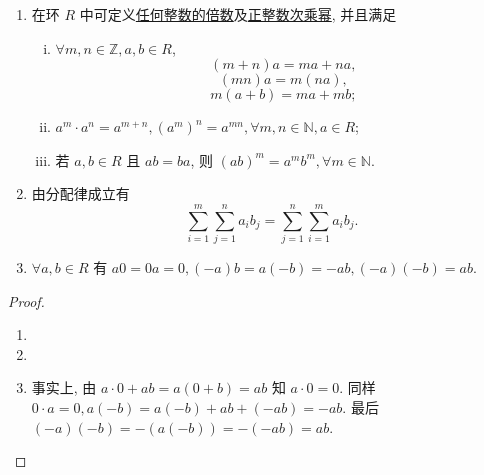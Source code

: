 \documentclass[../../main.tex]{subfiles}%
\begin{document}
\begin{theorem}[环的基本性质]\label{theorem:环的基本性质}
\begin{enumerate}[(1)]
\item 在环 \( R \) 中可定义\hyperref[definition:倍数的定义]{任何整数的倍数}及\hyperref[definition:n次乘幂]{正整数次乘幂}, 并且满足
\begin{enumerate}[(i)]
\item \( \forall m,n \in \mathbb{Z}, a,b \in R \),
\[
(m + n)a = ma + na,
\]
\[
(mn)a = m(na),
\]
\[
m(a + b) = ma + mb;
\]
\item \( a^m \cdot a^n = a^{m+n}, (a^m)^n = a^{mn}, \forall m,n \in \mathbb{N}, a \in R \);
\item 若 \( a,b \in R \) 且 \( ab = ba \), 则 \( (ab)^m = a^m b^m, \forall m \in \mathbb{N} \).
\end{enumerate}

\item 由分配律成立有
\[
\sum_{i=1}^m \sum_{j=1}^n a_i b_j = \sum_{j=1}^n \sum_{i=1}^m a_i b_j.
\]

\item \( \forall a,b \in R \) 有 \( a0 = 0a = 0, (-a)b = a(-b) = -ab, (-a)(-b) = ab \).
\end{enumerate}
\end{theorem}
\begin{proof}
\begin{enumerate}[(1)]
\item 

\item 

\item 事实上, 由 \( a \cdot 0 + ab = a(0 + b) = ab \) 知 \( a \cdot 0 = 0 \). 同样 \( 0 \cdot a = 0, a(-b) = a(-b) + ab + (-ab) = -ab \). 最后 \( (-a)(-b) = -(a(-b)) = -(-ab) = ab \).
\end{enumerate}

\end{proof}
\end{document}
